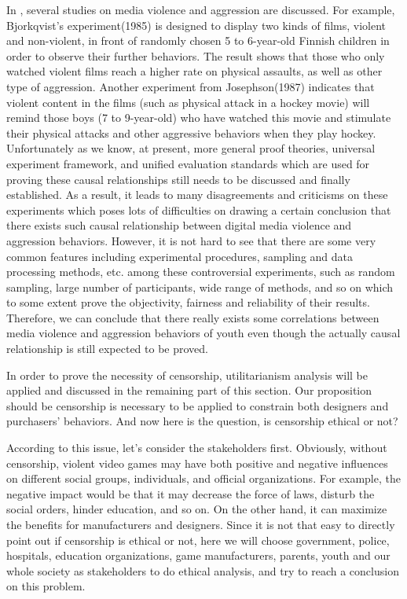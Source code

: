  In \cite{anderson2003}, several studies on media violence and aggression are discussed. For example, Bjorkqvist's experiment(1985)   is designed to display two kinds of films, violent and non-violent, in front of randomly chosen 5 to 6-year-old Finnish children in order to observe their further behaviors. The result shows that those who only watched violent films reach a higher rate on physical assaults, as well as other type of aggression. Another experiment from Josephson(1987)  indicates that violent content in the films (such as physical attack in a hockey movie) will remind those boys (7 to 9-year-old) who have watched this movie and stimulate their physical attacks and other aggressive behaviors when they play hockey. Unfortunately as we know, at present, more general proof theories, universal experiment framework, and unified evaluation standards which are used for proving these causal relationships still needs to be discussed and finally established. As a result, it leads to many disagreements and criticisms on these experiments which poses lots of difficulties on drawing a certain conclusion that there exists such causal relationship between digital media violence and aggression behaviors. However, it is not hard to see that there are some very common features including experimental procedures, sampling and data processing methods, etc. among these controversial experiments, such as random sampling, large number of participants, wide range of methods, and so on which to some extent prove the objectivity, fairness and reliability of their results. Therefore, we can conclude that there really exists some correlations between media violence and aggression behaviors of youth even though the actually causal relationship is still expected to be proved. 

In order to prove the necessity of censorship, utilitarianism analysis will be applied and discussed in the remaining part of this section. Our proposition should be censorship is necessary to be applied to constrain both designers and purchasers' behaviors. And now here is the question, is censorship ethical or not? 

According to this issue, let's consider the stakeholders first. Obviously, without censorship, violent video games may have both positive and negative influences on different social groups, individuals, and official organizations. For example, the negative impact would be that it may decrease the force of laws, disturb the social orders, hinder education, and so on. On the other hand, it can maximize the benefits for manufacturers and designers. Since it is not that easy to directly point out if censorship is ethical or not, here we will choose government, police, hospitals, education organizations, game manufacturers, parents, youth and our whole society as stakeholders to do ethical analysis, and try to reach a conclusion on this problem.

